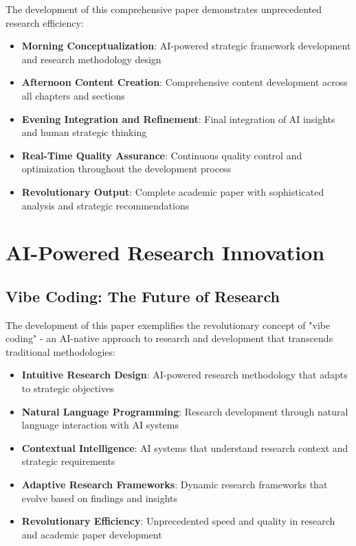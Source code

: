 \documentclass[12pt,a4paper]{book}
\begin{document}
The development of this comprehensive paper demonstrates unprecedented research efficiency:

\begin{itemize}
    \item \textbf{Morning Conceptualization}: AI-powered strategic framework development and research methodology design
    \item \textbf{Afternoon Content Creation}: Comprehensive content development across all chapters and sections
    \item \textbf{Evening Integration and Refinement}: Final integration of AI insights and human strategic thinking
    \item \textbf{Real-Time Quality Assurance}: Continuous quality control and optimization throughout the development process
    \item \textbf{Revolutionary Output}: Complete academic paper with sophisticated analysis and strategic recommendations
\end{itemize}

\section{AI-Powered Research Innovation}

\subsection{Vibe Coding: The Future of Research}

The development of this paper exemplifies the revolutionary concept of "vibe coding" - an AI-native approach to research and development that transcends traditional methodologies:

\begin{itemize}
    \item \textbf{Intuitive Research Design}: AI-powered research methodology that adapts to strategic objectives
    \item \textbf{Natural Language Programming}: Research development through natural language interaction with AI systems
    \item \textbf{Contextual Intelligence}: AI systems that understand research context and strategic requirements
    \item \textbf{Adaptive Research Frameworks}: Dynamic research frameworks that evolve based on findings and insights
    \item \textbf{Revolutionary Efficiency}: Unprecedented speed and quality in research and academic paper development
\end{itemize}
\end{document}

